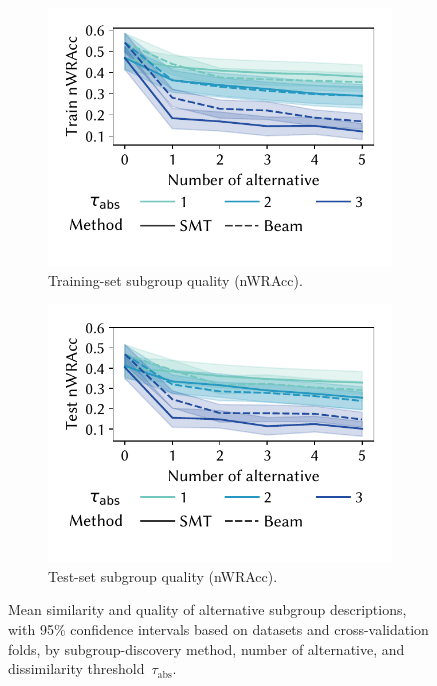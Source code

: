 \documentclass[acmsmall]{acmart} %
\theoremstyle{acmplain}
\theoremstyle{acmdefinition}
\begin{document}
\begin{figure}[t]
	\begin{subfigure}[t]{0.48\textwidth}
		\centering
		\includegraphics[width=\textwidth, trim=10 25 10 10, clip]{plots/csd-alternatives-train-nwracc.pdf}
		\caption{Training-set subgroup quality (nWRAcc).}
		\label{fig:csd:alternatives-train-nwracc}
	\end{subfigure}
	\hfill
	\begin{subfigure}[t]{0.48\textwidth}
		\centering
		\includegraphics[width=\textwidth, trim=10 25 10 10, clip]{plots/csd-alternatives-test-nwracc.pdf}
		\caption{Test-set subgroup quality (nWRAcc).}
		\label{fig:csd:alternatives-test-nwracc}
	\end{subfigure}
	\caption{
		Mean similarity and quality of alternative subgroup descriptions, with 95\% confidence intervals based on datasets and cross-validation folds, by subgroup-discovery method, number of alternative, and dissimilarity threshold~$\tau_{\text{abs}}$.
	}
	\label{fig:csd:alternatives}
\end{figure}
\end{document}
